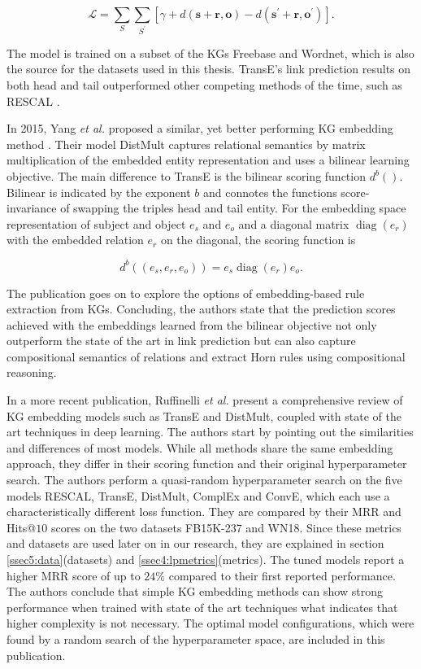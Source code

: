 \begin{equation}
    \mathcal{L}=\sum_{S} \sum_{S^{\prime}} \left[\gamma+d(\boldsymbol{s}+\boldsymbol{r}, \boldsymbol{o})-d\left(\boldsymbol{s}^{\prime}+\boldsymbol{r}, \boldsymbol{o}^{\prime}\right)\right].
\end{equation}

The model is trained on a subset of the KGs Freebase and Wordnet, which is also the source for the datasets used in this thesis. TransE's link prediction results on both head and tail outperformed other competing methods of the time, such as RESCAL \cite{nickel_three-way_nodate}.

In 2015, Yang \textit{et al.} proposed a similar, yet better performing KG embedding method \cite{yang_embedding_2015}. Their model DistMult captures relational semantics by matrix multiplication of the embedded entity representation and uses a bilinear learning objective. The main difference to TransE is the bilinear scoring function $d^{b}()$. Bilinear is indicated by the exponent $b$ and connotes the functions score-invariance of swapping the triples head and tail entity. For the embedding space representation of subject and object $e_s$ and $e_{o}$ and a diagonal matrix $\operatorname{diag}(e_{r})$ with the embedded relation $e_r$ on the diagonal, the scoring function is

\begin{equation}
    d^{b}\left((e_s,e_r,e_o)\right)=e_s \operatorname{diag}(e_{r}) e_o.
    \label{eq2:distmult}
\end{equation}

The publication goes on to explore the options of embedding-based rule extraction from KGs. Concluding, the authors state that the prediction scores achieved with the embeddings learned from the bilinear objective not only outperform the state of the art in link prediction but can also capture compositional semantics of relations and extract Horn rules using compositional reasoning.

In a more recent publication, Ruffinelli \textit{et al.} present a comprehensive review of KG embedding models such as TransE and DistMult, coupled with state of the art techniques in deep learning. The authors start by pointing out the similarities and differences of most models. While all methods share the same embedding approach, they differ in their scoring function and their original hyperparameter search. The authors perform a quasi-random hyperparameter search on the five models RESCAL, TransE, DistMult, ComplEx and ConvE, which each use a characteristically different loss function. They are compared by their MRR and Hits@$10$ scores on the two datasets FB15K-237 and WN18. Since these metrics and datasets are used later on in our research, they are explained in section \ref{ssec5:data}(datasets) and \ref{ssec4:lpmetrics}(metrics). The tuned models report a higher MRR score of up to $24\%$ compared to their first reported performance. The authors conclude that simple KG embedding methods can show strong performance when trained with state of the art techniques what indicates that higher complexity is not necessary. The optimal model configurations, which were found by a random search of the hyperparameter space, are included in this publication. 

